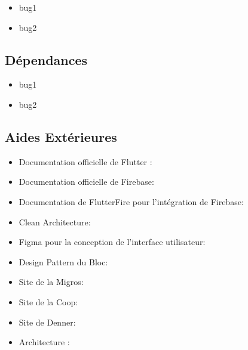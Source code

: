 \begin{itemize}[noitemsep]
    \item bug1
    \item bug2
\end{itemize}

\subsection{Dépendances}

\begin{itemize}[noitemsep]
    \item bug1
    \item bug2
\end{itemize}

\subsection{Aides Extérieures}

\begin{itemize}[noitemsep]
    \item Documentation officielle de Flutter : \cite{flutterDocs}
    \item Documentation officielle de Firebase: \cite{firebaseDocs}
    \item Documentation de FlutterFire pour l'intégration de Firebase: \cite{flutterFireDocs}
    \item Clean Architecture: \cite{cleanArchitecture}
    \item Figma pour la conception de l'interface utilisateur: \cite{figma}
    \item Design Pattern du Bloc: \cite{blocPattern}
    \item Site de la Migros: \cite{migros}
    \item Site de la Coop: \cite{coop}
    \item Site de Denner: \cite{denner}
    \item Architecture : \cite{googleCloudArchitecture}
\end{itemize}
